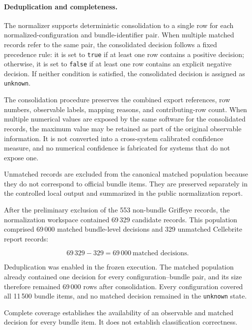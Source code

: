 \paragraph{Deduplication and completeness.}

The normalizer supports deterministic consolidation to a single row for each
normalized-configuration and bundle-identifier pair. When multiple matched
records refer to the same pair, the consolidated decision follows a fixed
precedence rule: it is set to \texttt{true} if at least one row contains a
positive decision; otherwise, it is set to \texttt{false} if at least one row
contains an explicit negative decision. If neither condition is satisfied, the
consolidated decision is assigned as \texttt{unknown}.

The consolidation procedure preserves the combined export references, row
numbers, observable labels, mapping reasons, and contributing-row count. When
multiple numerical values are exposed by the same software for the consolidated
records, the maximum value may be retained as part of the original observable
information. It is not converted into a cross-system calibrated confidence
measure, and no numerical confidence is fabricated for systems that do not
expose one.

Unmatched records are excluded from the canonical matched population because
they do not correspond to official bundle items. They are preserved separately
in the controlled local output and summarized in the public normalization
report.

After the preliminary exclusion of the 553 non-bundle Griffeye records, the
normalization workspace contained 69\,329 candidate records. This population
comprised 69\,000 matched bundle-level decisions and 329 unmatched Cellebrite
report records:

\begin{equation}
69\,329
-
329
=
69\,000\ \text{matched decisions}.
\end{equation}

Deduplication was enabled in the frozen execution. The matched population
already contained one decision for every configuration--bundle pair, and its
size therefore remained 69\,000 rows after consolidation. Every configuration
covered all 11\,500 bundle items, and no matched decision remained in the
\texttt{unknown} state.

Complete coverage establishes the availability of an observable and matched
decision for every bundle item. It does not establish classification
correctness.

